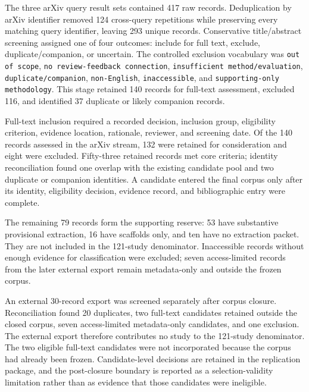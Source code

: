 \documentclass[10pt]{article}
\begin{document}
The three arXiv query result sets contained 417 raw records. Deduplication by arXiv identifier removed 124 cross-query repetitions while preserving every matching query identifier, leaving 293 unique records. Conservative title/abstract screening assigned one of four outcomes: include for full text, exclude, duplicate/companion, or uncertain. The controlled exclusion vocabulary was \texttt{out of scope}, \texttt{no review-feedback connection}, \texttt{insufficient method/evaluation}, \texttt{duplicate/companion}, \texttt{non-English}, \texttt{inaccessible}, and \texttt{supporting-only methodology}. This stage retained 140 records for full-text assessment, excluded 116, and identified 37 duplicate or likely companion records.

Full-text inclusion required a recorded decision, inclusion group, eligibility criterion, evidence location, rationale, reviewer, and screening date. Of the 140 records assessed in the arXiv stream, 132 were retained for consideration and eight were excluded. Fifty-three retained records met core criteria; identity reconciliation found one overlap with the existing candidate pool and two duplicate or companion identities. A candidate entered the final corpus only after its identity, eligibility decision, evidence record, and bibliographic entry were complete.

The remaining 79 records form the supporting reserve: 53 have substantive provisional extraction, 16 have scaffolds only, and ten have no extraction packet. They are not included in the 121-study denominator. Inaccessible records without enough evidence for classification were excluded; seven access-limited records from the later external export remain metadata-only and outside the frozen corpus.

An external 30-record export was screened separately after corpus closure. Reconciliation found 20 duplicates, two full-text candidates retained outside the closed corpus, seven access-limited metadata-only candidates, and one exclusion. The external export therefore contributes no study to the 121-study denominator. The two eligible full-text candidates were not incorporated because the corpus had already been frozen. Candidate-level decisions are retained in the replication package, and the post-closure boundary is reported as a selection-validity limitation rather than as evidence that those candidates were ineligible.
\end{document}
